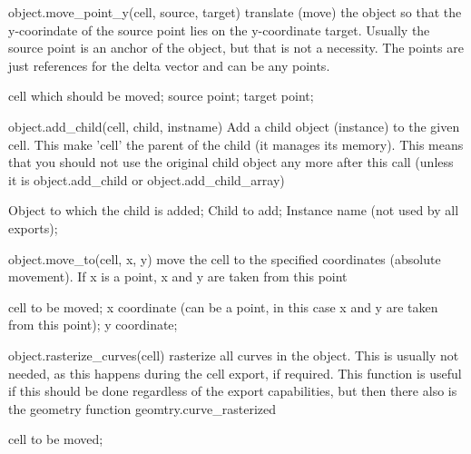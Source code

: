 \begin{APIfunc}{object.move\_point\_y(cell, source, target)}
    translate (move) the object so that the y-coorindate of the source point lies on the y-coordinate target. Usually the source point is an anchor of the object, but that is not a necessity. The points are just references for the delta vector and can be any points.
    \begin{APIparameters}
            cell which should be moved;
            source point;
            target point;
    \end{APIparameters}
\end{APIfunc}
\begin{APIfunc}{object.add\_child(cell, child, instname)}
    Add a child object (instance) to the given cell. This make 'cell' the parent of the child (it manages its memory). This means that you should not use the original child object any more after this call (unless it is object.add\_child or object.add\_child\_array)
    \begin{APIparameters}
            Object to which the child is added;
            Child to add;
            Instance name (not used by all exports);
    \end{APIparameters}
\end{APIfunc}
\begin{APIfunc}{object.move\_to(cell, x, y)}
    move the cell to the specified coordinates (absolute movement). If x is a point, x and y are taken from this point
    \begin{APIparameters}
            cell to be moved;
            x coordinate (can be a point, in this case x and y are taken from this point);
            y coordinate;
    \end{APIparameters}
\end{APIfunc}
\begin{APIfunc}{object.rasterize\_curves(cell)}
    rasterize all curves in the object. This is usually not needed, as this happens during the cell export, if required. This function is useful if this should be done regardless of the export capabilities, but then there also is the geometry function geomtry.curve\_rasterized
    \begin{APIparameters}
            cell to be moved;
    \end{APIparameters}
\end{APIfunc}

